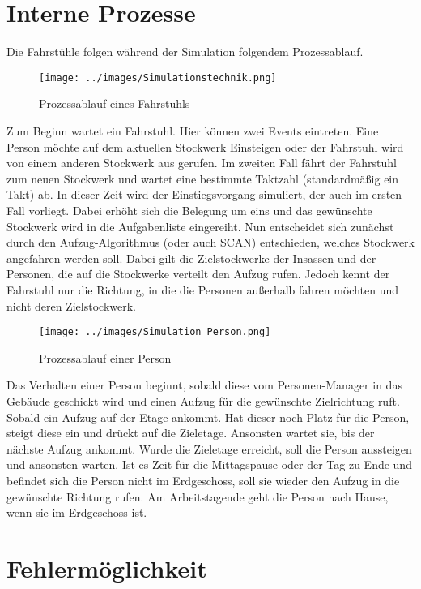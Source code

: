 \documentclass[envcountsame, envcountchap, deutsch]{i-studis}
\begin{document}
\hypertarget{interne-prozesse}{%
\section{Interne Prozesse}\label{interne-prozesse}}

Die Fahrstühle folgen während der Simulation folgendem Prozessablauf.

\begin{figure}
\centering
\texttt{[image: ../images/Simulationstechnik.png]}
\caption{Prozessablauf eines Fahrstuhls}
\end{figure}

Zum Beginn wartet ein Fahrstuhl. Hier können zwei Events eintreten. Eine
Person möchte auf dem aktuellen Stockwerk Einsteigen oder der Fahrstuhl
wird von einem anderen Stockwerk aus gerufen. Im zweiten Fall fährt der
Fahrstuhl zum neuen Stockwerk und wartet eine bestimmte Taktzahl
(standardmäßig ein Takt) ab. In dieser Zeit wird der Einstiegsvorgang
simuliert, der auch im ersten Fall vorliegt. Dabei erhöht sich die
Belegung um eins und das gewünschte Stockwerk wird in die Aufgabenliste
eingereiht. Nun entscheidet sich zunächst durch den Aufzug-Algorithmus
(oder auch SCAN) entschieden, welches Stockwerk angefahren werden soll.
Dabei gilt die Zielstockwerke der Insassen und der Personen, die auf die
Stockwerke verteilt den Aufzug rufen. Jedoch kennt der Fahrstuhl nur die
Richtung, in die die Personen außerhalb fahren möchten und nicht deren
Zielstockwerk.

\begin{figure}
\centering
\texttt{[image: ../images/Simulation\_Person.png]}
\caption{Prozessablauf einer Person}
\end{figure}

Das Verhalten einer Person beginnt, sobald diese vom Personen-Manager in
das Gebäude geschickt wird und einen Aufzug für die gewünschte
Zielrichtung ruft. Sobald ein Aufzug auf der Etage ankommt. Hat dieser
noch Platz für die Person, steigt diese ein und drückt auf die
Zieletage. Ansonsten wartet sie, bis der nächste Aufzug ankommt. Wurde
die Zieletage erreicht, soll die Person aussteigen und ansonsten warten.
Ist es Zeit für die Mittagspause oder der Tag zu Ende und befindet sich
die Person nicht im Erdgeschoss, soll sie wieder den Aufzug in die
gewünschte Richtung rufen. Am Arbeitstagende geht die Person nach Hause,
wenn sie im Erdgeschoss ist.

\hypertarget{fehlermuxf6glichkeit}{%
\section{Fehlermöglichkeit}\label{fehlermuxf6glichkeit}}
\end{document}
